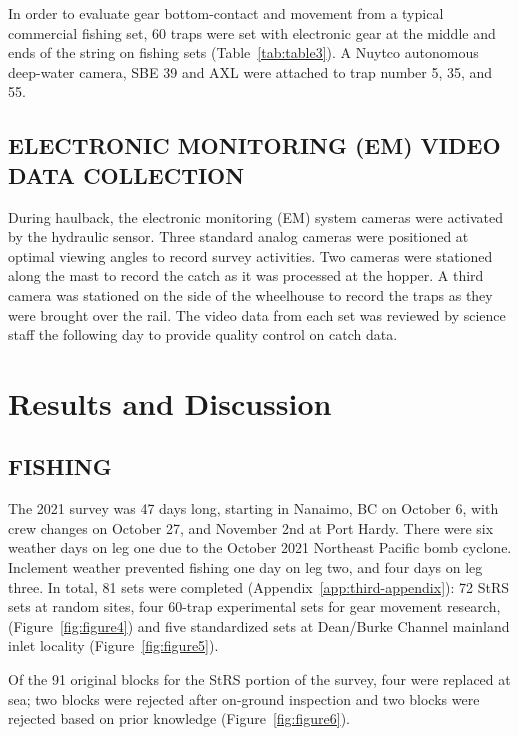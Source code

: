 \documentclass[12pt]{article}\usepackage[]{graphicx}\usepackage[]{color}
\begin{document}
In order to evaluate gear bottom-contact and movement from a typical commercial fishing set, 60 traps were set with electronic gear at the middle and ends of the string on fishing sets (Table~\ref{tab:table3}). A Nuytco autonomous deep-water camera, SBE 39 and AXL were attached to trap number 5, 35, and 55.

\hypertarget{electronic-monitoring-em-video-data-collection}{%
\subsection{ELECTRONIC MONITORING (EM) VIDEO DATA COLLECTION}\label{electronic-monitoring-em-video-data-collection}}

During haulback, the electronic monitoring (EM) system cameras were activated by the hydraulic sensor. Three standard analog cameras were positioned at optimal viewing angles to record survey activities. Two cameras were stationed along the mast to record the catch as it was processed at the hopper. A third camera was stationed on the side of the wheelhouse to record the traps as they were brought over the rail. The video data from each set was reviewed by science staff the following day to provide quality control on catch data.

\hypertarget{results-and-discussion}{%
\section{Results and Discussion}\label{results-and-discussion}}

\hypertarget{fishing}{%
\subsection{FISHING}\label{fishing}}

The 2021 survey was 47 days long, starting in Nanaimo, BC on October 6, with crew changes on October 27, and November 2nd at Port Hardy. There were six weather days on leg one due to the October 2021 Northeast Pacific bomb cyclone. Inclement weather prevented fishing one day on leg two, and four days on leg three. In total, 81 sets were completed (Appendix~\ref{app:third-appendix}): 72 StRS sets at random sites, four 60-trap experimental sets for gear movement research, (Figure~\ref{fig:figure4}) and five standardized sets at Dean/Burke Channel mainland inlet locality (Figure~\ref{fig:figure5}).

Of the 91 original blocks for the StRS portion of the survey, four were replaced at sea; two blocks were rejected after on-ground inspection and two blocks were rejected based on prior knowledge (Figure~\ref{fig:figure6}).
\end{document}
